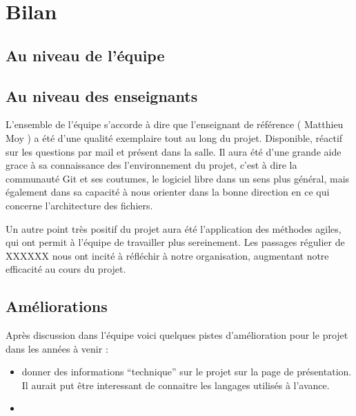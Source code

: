 \documentclass[11pt]{article}
\begin{document}
\section{Bilan}

\subsection*{Au niveau de l'équipe}

\subsection*{Au niveau des enseignants}

L'ensemble de l'équipe s'accorde à dire que l'enseignant de référence ( Matthieu Moy ) a été d'une qualité exemplaire tout au long du projet. Disponible, réactif sur les questions par mail et présent dans la salle. Il aura été d'une grande aide grace à sa connaissance des l'environnement du projet, c'est à dire la communauté Git et ses coutumes, le logiciel libre dans un sens plus général, mais également dans sa capacité à nous orienter dans la bonne direction en ce qui concerne l'architecture des fichiers. 

Un autre point très positif du projet aura été l'application des méthodes agiles, qui ont permit à l'équipe de travailler plus sereinement. Les passages régulier de XXXXXX nous ont incité à réfléchir à notre organisation, augmentant notre efficacité au cours du projet. 

\subsection*{Améliorations}

Après discussion dans l'équipe voici quelques pistes d'amélioration pour le projet dans les années à venir : 

\begin{itemize}
\item donner des informations ``technique'' sur le projet sur la page de présentation. Il aurait put être interessant de connaitre les langages utilisés à l'avance. 
\item 
\end{itemize}
\end{document}
